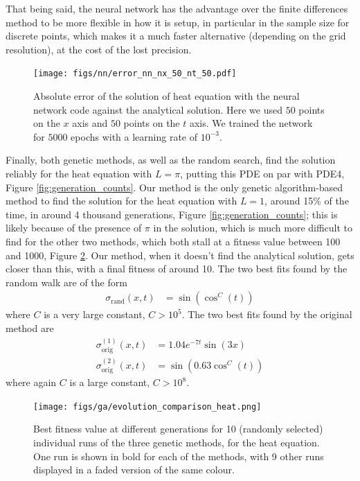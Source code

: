 \documentclass[aps,reprint,superscriptaddress,nofootinbib]{revtex4-2}
\begin{document}
    That being said, the neural network has the advantage over the finite differences method to be more flexible in how it is setup, in particular in the sample size for discrete points, which makes it a much faster alternative (depending on the grid resolution), at the cost of the lost precision.

\begin{figure}[h]
    \centering
    \texttt{[image: figs/nn/error\_nn\_nx\_50\_nt\_50.pdf]}
    \caption{Absolute error of the solution of heat equation with the neural network code against the analytical solution. Here we used \(50\) points on the \(x\) axis and \(50\) points on the \(t\) axis. We trained the network for \(5000\) epochs with a learning rate of \(10^{-3}\).}
    \label{fig:error_nn}
\end{figure}



Finally, both genetic methods, as well as the random search, find the solution reliably for the heat equation with \(L = \pi\), putting this PDE on par with PDE4, Figure \ref{fig:generation_counts}. Our method is the only genetic algorithm-based method to find the solution for the heat equation with \(L=1\), around 15\% of the time, in around 4 thousand generations, Figure \ref{fig:generation_counts}; this is likely because of the presence of \(\pi\) in the solution, which is much more difficult to find for the other two methods, which both stall at a fitness value between 100 and 1000, Figure \ref{fig:heat_res}. Our method, when it doesn't find the analytical solution, gets closer than this, with a final fitness of around 10. The two best fits found by the random walk are of the form
    \begin{align*}
        \sigma_{\text{rand}}(x, t) &= \sin(\cos^C(t))
    \end{align*}
    where \(C\) is a very large constant, \(C > 10^5\). The two best fits found by the original method are
    \begin{align*}
        \sigma_{\text{orig}}^{(1)}(x, t) &= 1.04 e^{-7t} \sin(3x)
        \\
        \sigma_{\text{orig}}^{(2)}(x, t) &= \sin(0.63\cos^C(t))
    \end{align*}
    where again \(C\) is a large constant, \(C > 10^8\).
    
    \begin{figure}[htp]
        \centering
        \texttt{[image: figs/ga/evolution\_comparison\_heat.png]}
        \caption{Best fitness value at different generations for 10 (randomly selected) individual runs of the three genetic methods, for the heat equation. One run is shown in bold for each of the methods, with 9 other runs displayed in a faded version of the same colour.}
        \label{fig:heat_res}
    \end{figure}
    
\end{document}
